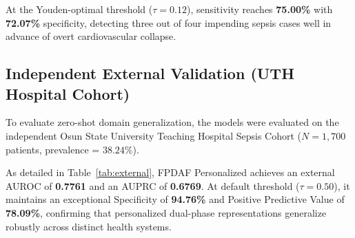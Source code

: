 \documentclass[10pt,a4paper,twocolumn,twoside]{article}
\begin{document}
At the Youden-optimal threshold ($\tau=0.12$), sensitivity reaches \textbf{75.00\%} with \textbf{72.07\%} specificity, detecting three out of four impending sepsis cases well in advance of overt cardiovascular collapse.

\subsection{Independent External Validation (UTH Hospital Cohort)}
To evaluate zero-shot domain generalization, the models were evaluated on the independent Osun State University Teaching Hospital Sepsis Cohort ($N=1,700$ patients, prevalence = $38.24\%$).

\begin{table}[t]
\centering
\small
\caption{Independent External Validation (UTH Cohort, N=1,700)}
\label{tab:external}
\end{table}

As detailed in Table~\ref{tab:external}, FPDAF Personalized achieves an external AUROC of \textbf{0.7761} and an AUPRC of \textbf{0.6769}. At default threshold ($\tau=0.50$), it maintains an exceptional Specificity of \textbf{94.76\%} and Positive Predictive Value of \textbf{78.09\%}, confirming that personalized dual-phase representations generalize robustly across distinct health systems.
\end{document}

